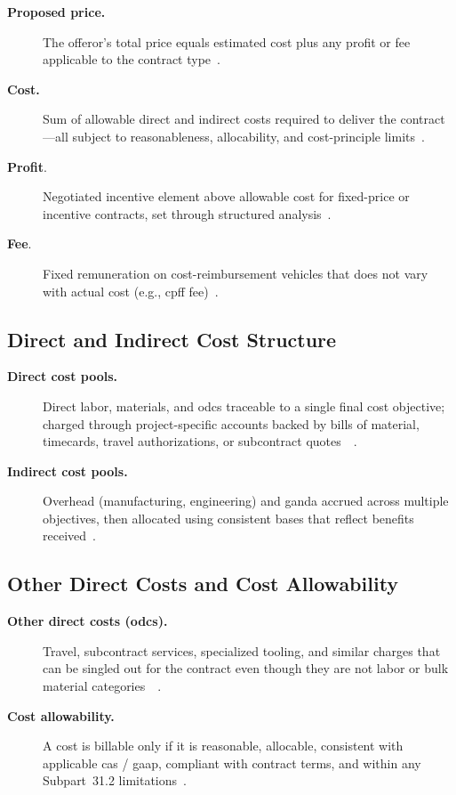 \documentclass[../main.tex]{subfiles}
\begin{document}
\begin{description}
	\item[\textbf{Proposed price.}] The offeror's total price equals estimated cost plus any profit or fee applicable to the contract type~\autocite[\S~15.401]{FAR}.
	\item[\textbf{Cost.}] Sum of allowable direct and indirect costs required to deliver the contract---all subject to reasonableness, allocability, and cost-principle limits~\autocite[\S\S~31.201-2, 31.202, 31.203]{FAR}.
	\item[\textbf{Profit}.] Negotiated incentive element above allowable cost for fixed-price or incentive contracts, set through structured analysis~\autocite[\S~15.404-4(a)]{FAR}.
	\item[\textbf{Fee}.] Fixed remuneration on cost-reimbursement vehicles that does not vary with actual cost (e.g., \ac{cpff} fee)~\autocite[\S~16.306(a)]{FAR}.
\end{description}

\subsection{Direct and Indirect Cost Structure}
\begin{description}
	\item[\textbf{Direct cost pools.}] Direct labor, materials, and \acp{odc} traceable to a single final cost objective; charged through project-specific accounts backed by bills of material, timecards, travel authorizations, or subcontract quotes~\autocite[\S~31.202]{FAR}~\autocite{edo-3-2-4-cost-price-evaluation-2024}.
	\item[\textbf{Indirect cost pools.}] Overhead (manufacturing, engineering) and \ac{ganda} accrued across multiple objectives, then allocated using consistent bases that reflect benefits received~\autocite[\S~31.203]{FAR}.
\end{description}

\subsection{Other Direct Costs and Cost Allowability}
\begin{description}
	\item[\textbf{Other direct costs (\acp{odc}).}] Travel, subcontract services, specialized tooling, and similar charges that can be singled out for the contract even though they are not labor or bulk material categories~\autocite[\S~31.202]{FAR}~\autocite{edo-3-2-4-cost-price-evaluation-2024}.
	\item[\textbf{Cost allowability.}] A cost is billable only if it is reasonable, allocable, consistent with applicable \ac{cas} / \ac{gaap}, compliant with contract terms, and within any Subpart~31.2 limitations~\autocite[\S~31.201-2]{FAR}.
\end{description}
\end{document}
